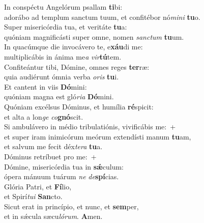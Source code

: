 \evenverse In conspéctu Angelórum psallam \textbf{ti}bi:~\*\\
\evenverse adorábo ad templum sanctum tuum, et confitébor nó\textit{mi}\textit{ni} \textbf{tu}o.\\
\oddverse Super misericórdia tua, et veritáte \textbf{tu}a:~\*\\
\oddverse quóniam magnificásti super omne, nomen \textit{san}\textit{ctum} \textbf{tu}um.\\
\evenverse In quacúmque die invocávero te, e\textbf{xáu}di me:~\*\\
\evenverse multiplicábis in ánima me\textit{a} \textit{vir}\textbf{tú}tem.\\
\oddverse Confiteántur tibi, Dómine, omnes reges \textbf{ter}ræ:~\*\\
\oddverse quia audiérunt ómnia verba \textit{o}\textit{ris} \textbf{tu}i.\\
\evenverse Et cantent in viis \textbf{Dó}mini:~\*\\
\evenverse quóniam magna est gló\textit{ri}\textit{a} \textbf{Dó}mini.\\
\oddverse Quóniam excélsus Dóminus, et humília \textbf{ré}spicit:~\*\\
\oddverse et alta a lon\textit{ge} \textit{co}\textbf{gnó}scit.\\
\evenverse Si ambulávero in médio tribulatiónis, vivificábis me:~+\\
\evenverse  et super iram inimicórum meórum extendísti manum \textbf{tu}am,~\*\\
\evenverse et salvum me fecit déx\textit{te}\textit{ra} \textbf{tu}a.\\
\oddverse Dóminus retríbuet pro me:~+\\
\oddverse  Dómine, misericórdia tua in \textbf{sǽ}culum:~\*\\
\oddverse ópera mánuum tuárum \textit{ne} \textit{de}\textbf{spí}cias.\\
\evenverse Glória Patri, et \textbf{Fí}lio,~\*\\
\evenverse et Spirí\textit{tu}\textit{i} \textbf{San}cto.\\
\oddverse Sicut erat in princípio, et nunc, et \textbf{sem}per,~\*\\
\oddverse et in sǽcula sæcu\textit{ló}\textit{rum}. \textbf{A}men.\\
